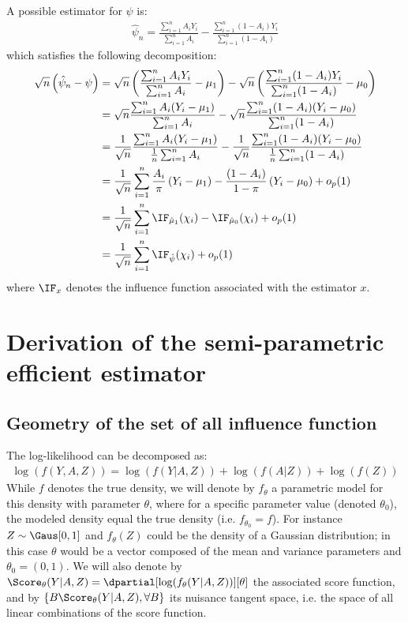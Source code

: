 \documentclass[12pt]{article}
\newcommand\sample{\chi}
\begin{document}
A possible estimator for \(\psi\) is:
\begin{align*}
\hat{\psi}_n = \frac{\sum_{i=1}^n A_i Y_i}{\sum_{i=1}^n A_i} - \frac{\sum_{i=1}^n (1-A_i) Y_i}{\sum_{i=1}^n (1-A_i)}
\end{align*}
which satisfies the following decomposition:
\begin{align*}
\sqrt{n}\left(\hat{\psi}_n - \psi\right) 
&= \sqrt{n} \left(\frac{\sum_{i=1}^n A_i Y_i}{\sum_{i=1}^n A_i} - \mu_1\right) - \sqrt{n} \left(\frac{\sum_{i=1}^n (1-A_i) Y_i}{\sum_{i=1}^n (1-A_i)} - \mu_0\right) \\
&= \sqrt{n} \frac{\sum_{i=1}^n A_i (Y_i-\mu_1)}{\sum_{i=1}^n A_i}  - \sqrt{n} \frac{\sum_{i=1}^n (1-A_i) (Y_i-\mu_0)}{\sum_{i=1}^n (1-A_i)} \\
&= \frac{1}{\sqrt{n}} \frac{\sum_{i=1}^n A_i (Y_i-\mu_1)}{\frac{1}{n}\sum_{i=1}^n A_i}  - \frac{1}{\sqrt{n}} \frac{\sum_{i=1}^n (1-A_i) (Y_i-\mu_0)}{\frac{1}{n}\sum_{i=1}^n (1-A_i)} \\
&= \frac{1}{\sqrt{n}} \sum_{i=1}^n \frac{A_i}{\pi} \left(Y_i - \mu_1\right) - \frac{(1-A_i)}{1-\pi}\left(Y_i - \mu_0\right) + o_p(1) \\
&= \frac{1}{\sqrt{n}} \sum_{i=1}^n \IF_{\hat{\mu}_1}(\sample_i) - \IF_{\hat{\mu}_0}(\sample_i)+ o_p(1) \\
&= \frac{1}{\sqrt{n}} \sum_{i=1}^n \IF_{\hat{\psi}}(\sample_i) + o_p(1)
\end{align*}
where \(\IF_x\) denotes the influence function associated with the
estimator \(x\).

\section{Derivation of the semi-parametric efficient estimator}
\label{sec:org91b19ae}

\subsection{Geometry of the set of all influence function}
\label{sec:orgbd9b5f5}
The log-likelihood can be decomposed as:
\begin{align*}
\log(f(Y,A,Z)) = \log(f(Y|A,Z)) + \log(f(A|Z)) + \log(f(Z))
\end{align*}
While \(f\) denotes the true density, we will denote by \(f_{\theta}\)
a parametric model for this density with parameter \(\theta\), where
for a specific parameter value (denoted \(\theta_0\)), the modeled
density equal the true density (i.e. \(f_{\theta_0}=f\)). For instance
\(Z\sim\Gaus[0,1]\) and \(f_{\theta}(Z)\) could be the density of a
Gaussian distribution; in this case \(\theta\) would be a vector
composed of the mean and variance parameters and
\(\theta_0=(0,1)\). We will also denote by
\(\Score_{\theta}(Y|A,Z)=\dpartial[\log(f_{\theta}(Y|A,Z))][\theta]\)
the associated score function, and by \(\left\{B
\Score_{\theta}(Y|A,Z), \forall B \right\}\) its nuisance tangent
space, i.e. the space of all linear combinations of the score
function.
\end{document}
